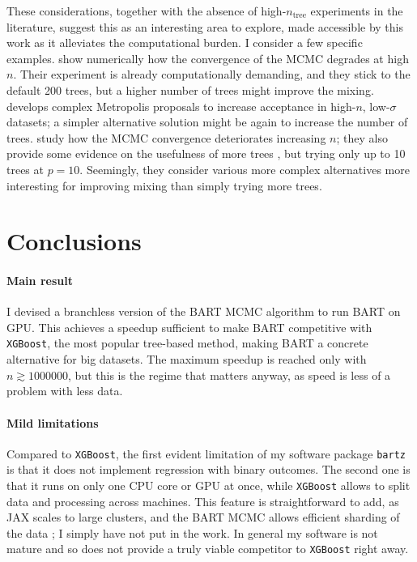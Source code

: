 \documentclass{article}
\begin{document}
    These considerations, together with the absence of high-$n_\text{tree}$ experiments in the literature, suggest this as an interesting area to explore, made accessible by this work as it alleviates the computational burden. I consider a few specific examples. \textcite[\S4.1]{ronen2022} show numerically how the convergence of the MCMC degrades at high $n$. Their experiment is already computationally demanding, and they stick to the default 200 trees, but a higher number of trees might improve the mixing. \textcite{pratola2016} develops complex Metropolis proposals to increase acceptance in high-$n$, low-$\sigma$ datasets; a simpler alternative solution might be again to increase the number of trees. \textcite{tan2024} study how the MCMC convergence deteriorates increasing $n$; they also provide some evidence on the usefulness of more trees \autocite[fig.~4, p.~16]{tan2024}, but trying only up to 10 trees at $p=10$. Seemingly, they consider various more complex alternatives more interesting for improving mixing than simply trying more trees.

    \section{Conclusions}

    \paragraph{Main result}

    I devised a branchless version of the BART MCMC algorithm to run BART on GPU. This achieves a speedup sufficient to make BART competitive with \texttt{XGBoost}, the most popular tree-based method, making BART a concrete alternative for big datasets. The maximum speedup is reached only with $n\gtrsim\num{1000000}$, but this is the regime that matters anyway, as speed is less of a problem with less data.

    \paragraph{Mild limitations}

    Compared to \texttt{XGBoost}, the first evident limitation of my software package \texttt{bartz} is that it does not implement regression with binary outcomes. The second one is that it runs on only one CPU core or GPU at once, while \texttt{XGBoost} allows to split data and processing across machines. This feature is straightforward to add, as JAX scales to large clusters, and the BART MCMC allows efficient sharding of the data \autocite{pratola2014}; I simply have not put in the work. In general my software is not mature and so does not provide a truly viable competitor to \texttt{XGBoost} right away.
\end{document}
